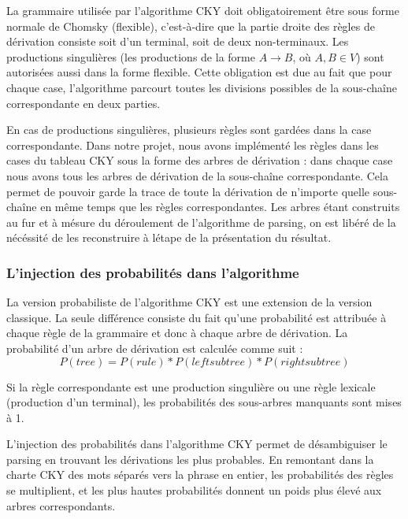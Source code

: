\documentclass[12pt]{article}
\begin{document}
La grammaire utilis\'ee par l'algorithme CKY doit obligatoirement \^etre sous forme
normale de Chomsky (flexible), c'est-\`a-dire que la partie droite des r\`egles de
d\'erivation consiste soit d'un terminal, soit de deux non-terminaux. Les productions
singuli\`eres (les productions de la forme $A \rightarrow B$, o\`u $A,B \in V$) sont
autoris\'ees aussi dans la forme flexible. Cette obligation est
due au fait que pour chaque case, l'algorithme parcourt toutes les divisions possibles de la sous-cha\^ine
correspondante en deux parties. \par

En cas de productions singuli\`eres, plusieurs r\`egles sont gard\'ees dans la case
correspondante. Dans notre projet, nous avons impl\'ement\'e les r\`egles dans les
cases du tableau CKY sous la forme des arbres de d\'erivation : dans chaque case
nous avons tous les arbres de d\'erivation de la sous-cha\^ine correspondante. Cela
permet de pouvoir garde la trace de toute la d\'erivation de n'importe quelle
sous-cha\^ine en m\^eme temps que les r\`egles correspondantes. Les arbres \'etant construits
au fur et \`a m\'esure du d\'eroulement de l'algorithme de parsing, on est lib\'er\'e de la n\'ec\'essit\'e
de les reconstruire \`a l\'etape de la pr\'esentation du r\'esultat.

\subsubsection{L'injection des probabilit\'es dans l'algorithme}

La version probabiliste de l'algorithme CKY est une extension de la version
classique. La seule diff\'erence consiste du fait qu'une probabilit\'e est attribu\'ee
\`a chaque r\`egle de la grammaire et donc \`a chaque arbre de d\'erivation. La
probabilit\'e d'un arbre de d\'erivation est calcul\'ee comme suit :
$$P(tree) = P(rule) * P(left subtree) * P(right subtree)$$

Si la r\`egle correspondante est une production singuli\`ere ou une r\`egle lexicale
(production d'un terminal), les probabilit\'es des sous-arbres manquants sont mises
\`a 1. \par

L'injection des probabilit\'es dans l'algorithme CKY permet de d\'esambiguiser le
parsing en trouvant les d\'erivations les plus probables. En remontant dans la
charte CKY des mots s\'epar\'es vers la phrase en entier, les probabilit\'es des
r\`egles se multiplient, et les plus hautes probabilit\'es donnent un poids plus \'elev\'e aux arbres correspondants. \par
\end{document}
